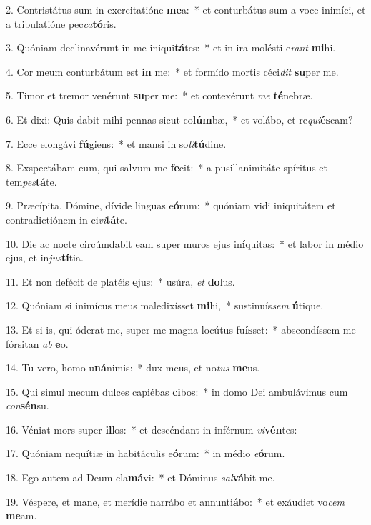 2. Contristátus sum in exercitatióne \textbf{me}a:~*  et conturbátus sum a voce inimíci, et a tribulatióne pec\textit{ca}\textbf{tó}ris.\

3. Quóniam declinavérunt in me iniqui\textbf{tá}tes:~*  et in ira molésti e\textit{rant} \textbf{mi}hi.\

4. Cor meum conturbátum est \textbf{in} me:~*  et formído mortis céci\textit{dit} \textbf{su}per me.\

5. Timor et tremor venérunt \textbf{su}per me:~*  et contexérunt \textit{me} \textbf{té}nebræ.\

6. Et dixi: Quis dabit mihi pennas sicut co\textbf{lúm}bæ,~*  et volábo, et re\textit{qui}\textbf{és}cam?\

7. Ecce elongávi \textbf{fú}giens:~*  et mansi in so\textit{li}\textbf{tú}dine.\

8. Exspectábam eum, qui salvum me \textbf{fe}cit:~*  a pusillanimitáte spíritus et tem\textit{pes}\textbf{tá}te.\

9. Præcípita, Dómine, dívide linguas e\textbf{ó}rum:~*  quóniam vidi iniquitátem et contradictiónem in ci\textit{vi}\textbf{tá}te.\

10. Die ac nocte circúmdabit eam super muros ejus in\textbf{í}quitas:~*  et labor in médio ejus, et in\textit{jus}\textbf{tí}tia.\

11. Et non defécit de platéis \textbf{e}jus:~*  usúra, \textit{et} \textbf{do}lus.\

12. Quóniam si inimícus meus maledixísset \textbf{mi}hi,~*  sustinuís\textit{sem} \textbf{ú}tique.\

13. Et si is, qui óderat me, super me magna locútus fu\textbf{ís}set:~*  abscondíssem me fórsitan \textit{ab} \textbf{e}o.\

14. Tu vero, homo u\textbf{ná}nimis:~*  dux meus, et no\textit{tus} \textbf{me}us.\

15. Qui simul mecum dulces capiébas \textbf{ci}bos:~*  in domo Dei ambulávimus cum \textit{con}\textbf{sén}su.\

16. Véniat mors super \textbf{il}los:~*  et descéndant in inférnum \textit{vi}\textbf{vén}tes:\

17. Quóniam nequítiæ in habitáculis e\textbf{ó}rum:~*  in médio \textit{e}\textbf{ó}rum.\

18. Ego autem ad Deum cla\textbf{má}vi:~*  et Dóminus \textit{sal}\textbf{vá}bit me.\

19. Véspere, et mane, et merídie narrábo et annunti\textbf{á}bo:~*  et exáudiet vo\textit{cem} \textbf{me}am.\

